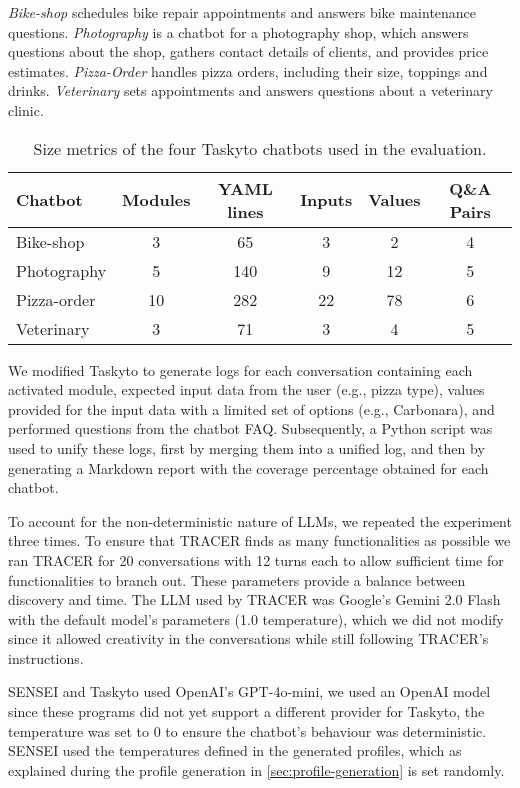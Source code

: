 \textit{Bike-shop} schedules bike repair appointments
and answers bike maintenance questions.
\textit{Photography} is a chatbot for a photography shop,
which answers questions about the shop,
gathers contact details of clients, and provides price estimates.
\textit{Pizza-Order} handles pizza orders,
including their size, toppings and drinks.
\textit{Veterinary} sets appointments and answers questions about a veterinary clinic.

\begin{table}[htpb]
\centering
\caption{Size metrics of the four Taskyto chatbots used in the evaluation.}
\label{tab:rq1_chatbots}
\begin{tabular}{@{}lccccc@{}}
\toprule
\textbf{Chatbot} & \textbf{Modules} & \textbf{YAML lines} & \textbf{Inputs} & \textbf{Values} & \textbf{Q\&A Pairs} \\ \midrule
Bike-shop & 3 & 65 & 3 & 2 & 4 \\
Photography & 5 & 140 & 9 & 12 & 5 \\
Pizza-order & 10 & 282 & 22 & 78 & 6 \\
Veterinary & 3 & 71 & 3 & 4 & 5 \\ \bottomrule
\end{tabular}
\end{table}

We modified Taskyto to generate logs
for each conversation containing
each activated module,
expected input data from the user (e.g., pizza type),
values provided for the input data with a limited set of options (e.g., Carbonara),
and performed questions from the chatbot FAQ.
Subsequently, a Python script was used to unify these logs,
first by merging them into a unified log,
and then by generating a Markdown report
with the coverage percentage obtained for each chatbot.

To account for the non-deterministic nature of \acp{LLM},
we repeated the experiment three times.
To ensure that \ac{TRACER} finds as many functionalities as possible
we ran TRACER for 20 conversations with 12 turns each
to allow sufficient time for functionalities to branch out.
These parameters provide a balance between discovery and time.
The \ac{LLM} used by \ac{TRACER} was Google's Gemini 2.0 Flash
with the default model's parameters (1.0 temperature),
which we did not modify since it allowed creativity in the conversations
while still following \ac{TRACER}'s instructions.

SENSEI and Taskyto used OpenAI's GPT-4o-mini,
we used an OpenAI model
since these programs did not yet support a different provider
for Taskyto, the temperature was set to 0
to ensure the chatbot's behaviour was deterministic.
SENSEI used the temperatures defined in the generated profiles,
which as explained during the profile generation in \autoref{sec:profile-generation}
is set randomly.


